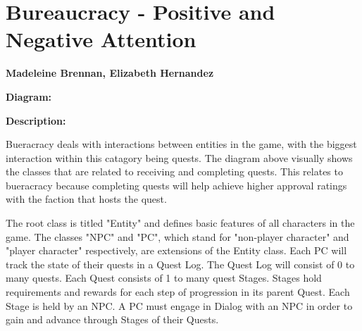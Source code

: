 \documentclass{report}
\begin{document}
\chapter{Bureaucracy - Positive and Negative Attention}
\textbf{Madeleine Brennan, Elizabeth Hernandez}

\textbf{Diagram:}

\textbf{Description:}

Bueracracy deals with interactions between entities in the game, with the biggest interaction within this catagory being quests. The diagram above visually shows the classes that are related to receiving and completing quests. This relates to bueracracy because completing quests will help achieve higher approval ratings with the faction that hosts the quest.

The root class is titled "Entity" and defines basic features of all characters in the game.
The classes "NPC" and "PC", which stand for "non-player character" and "player character" respectively, are extensions of the Entity class. 
Each PC will track the state of their quests in a Quest Log. 
The Quest Log will consist of 0 to many quests.
Each Quest consists of 1 to many quest Stages.
Stages hold requirements and rewards for each step of progression in its parent Quest.
Each Stage is held by an NPC.
A PC must engage in Dialog with an NPC in order to gain and advance through Stages of their Quests.
\end{document}
